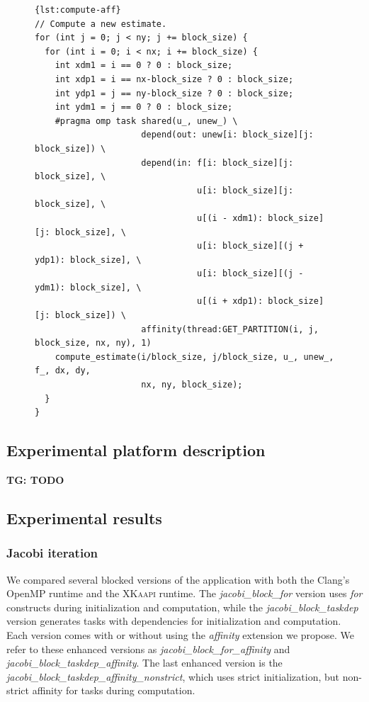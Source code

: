 \documentclass{Styles/llncs}
\newcommand{\kaapi}{\textsc{\mbox{XKaapi}}\xspace}
\newcommand{\TG}[1]{{\color{red}\bfseries TG: #1}}
\begin{document}
\begin{figure}[htbp]
\begin{lstlisting}[caption=Example of use of the affinity clause for computation,frame=tlrb,style=smaller,label=lst:compute-aff]{lst:compute-aff}
// Compute a new estimate.
for (int j = 0; j < ny; j += block_size) {
  for (int i = 0; i < nx; i += block_size) {
    int xdm1 = i == 0 ? 0 : block_size;
    int xdp1 = i == nx-block_size ? 0 : block_size;
    int ydp1 = j == ny-block_size ? 0 : block_size;
    int ydm1 = j == 0 ? 0 : block_size;
    #pragma omp task shared(u_, unew_) \
                     depend(out: unew[i: block_size][j: block_size]) \
                     depend(in: f[i: block_size][j: block_size], \
                                u[i: block_size][j: block_size], \
                                u[(i - xdm1): block_size][j: block_size], \
                                u[i: block_size][(j + ydp1): block_size], \
                                u[i: block_size][(j - ydm1): block_size], \
                                u[(i + xdp1): block_size][j: block_size]) \
                     affinity(thread:GET_PARTITION(i, j, block_size, nx, ny), 1)
    compute_estimate(i/block_size, j/block_size, u_, unew_, f_, dx, dy,
                     nx, ny, block_size);
  }
}
\end{lstlisting}
\end{figure}

\subsection{Experimental platform description}
\label{sec:idchire}
\TG{TODO}

\subsection{Experimental results}
\label{sec:experiment}

\subsubsection{Jacobi iteration}

We compared several blocked versions of the application with both the Clang's OpenMP runtime
and the \kaapi runtime. The \textit{jacobi\_block\_for} version uses \emph{for} constructs during initialization and computation, while the \textit{jacobi\_block\_taskdep} version generates tasks with dependencies for initialization and computation. Each version comes with or without using the \emph{affinity} extension we propose. We refer to these enhanced versions as \textit{jacobi\_block\_for\_affinity} and \textit{jacobi\_block\_taskdep\_affinity}. The last enhanced version is the
\textit{jacobi\_block\_taskdep\_affinity\_nonstrict}, which uses strict initialization, but non-strict affinity for tasks during computation.
\end{document}
